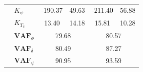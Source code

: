 \begin{table}[]
\begin{tabular}{llcccc}
                                                   & $K_\psi $                                                        & -190.37                                     & 49.63                                                & -211.40                                     & 56.88                                                \\
                                                   & $K_{T_\delta}$                                                   & 13.40                                       & 14.18                                                & 15.81                                       & 10.28                                                \\ \cline{2-6} 
                                                   & $\mathbf{VAF}_\phi$                                              & \multicolumn{2}{c}{79.68}                                                                          & \multicolumn{2}{c}{80.57}                                                                          \\
                                                   & $\mathbf{VAF}_\delta$                                            & \multicolumn{2}{c}{80.49}                                                                          & \multicolumn{2}{c}{87.27}                                                                          \\
                                                   & $\mathbf{VAF}_\psi$                                              & \multicolumn{2}{c}{90.95}                                                                          & \multicolumn{2}{c}{93.59}                                                                         
    \end{tabular}
    \end{table}